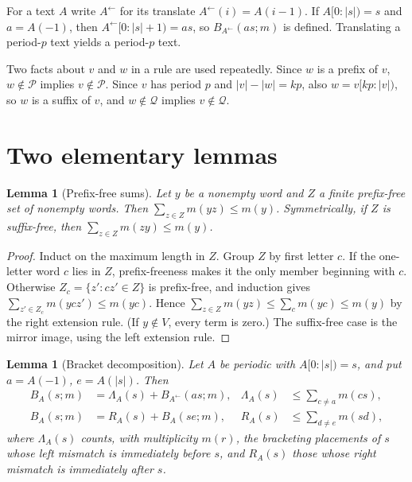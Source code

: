\documentclass[11pt]{article}
\numberwithin{equation}{section}
\newtheorem{lemma}[theorem]{Lemma}
\theoremstyle{definition}
\newcommand{\len}[1]{\lvert #1\rvert}
\newcommand{\Pre}{\mathcal P}
\newcommand{\Suf}{\mathcal Q}
\newcommand{\lsh}[1]{#1^{\leftarrow}}
\begin{document}
For a text $A$ write $\lsh A$ for its translate $\lsh A(i)=A(i-1)$. If
$A[0:\len s)=s$ and $a=A(-1)$, then $\lsh A[0:\len s+1)=as$, so
$B_{\lsh A}(as;m)$ is defined. Translating a period-$p$ text yields a
period-$p$ text.

Two facts about $v$ and $w$ in a rule are used repeatedly. Since $w$ is a
prefix of $v$, $w\notin\Pre$ implies $v\notin\Pre$. Since $v$ has period $p$
and $\len v-\len w=kp$, also $w=v[kp:\len v)$, so $w$ is a suffix of $v$, and
$w\notin\Suf$ implies $v\notin\Suf$.

\section{Two elementary lemmas}

\begin{lemma}[Prefix-free sums]\label{lem:pfree}
Let $y$ be a nonempty word and $Z$ a finite prefix-free set of nonempty
words. Then $\sum_{z\in Z}m(yz)\le m(y)$. Symmetrically, if $Z$ is
suffix-free, then $\sum_{z\in Z}m(zy)\le m(y)$.
\end{lemma}

\begin{proof}
Induct on the maximum length in $Z$. Group $Z$ by first letter $c$. If the
one-letter word $c$ lies in $Z$, prefix-freeness makes it the only member
beginning with $c$. Otherwise $Z_c=\{z':cz'\in Z\}$ is prefix-free, and
induction gives $\sum_{z'\in Z_c}m(ycz')\le m(yc)$. Hence
$\sum_{z\in Z}m(yz)\le\sum_c m(yc)\le m(y)$ by the right extension rule.
(If $y\notin V$, every term is zero.) The suffix-free case is the mirror image,
using the left extension rule.
\end{proof}

\begin{lemma}[Bracket decomposition]\label{lem:decomp}
Let $A$ be periodic with $A[0:\len s)=s$, and put $a=A(-1)$, $e=A(\len s)$.
Then
\begin{align}
B_A(s;m)&=\Lambda_A(s)+B_{\lsh A}(as;m),&\Lambda_A(s)&\le\sum_{c\ne a}m(cs),\label{eq:left-decomp}\\
B_A(s;m)&=R_A(s)+B_A(se;m),&R_A(s)&\le\sum_{d\ne e}m(sd),\label{eq:right-decomp}
\end{align}
where $\Lambda_A(s)$ counts, with multiplicity $m(r)$, the bracketing
placements of $s$ whose left mismatch is immediately before $s$, and
$R_A(s)$ those whose right mismatch is immediately after $s$.
\end{lemma}
\end{document}
